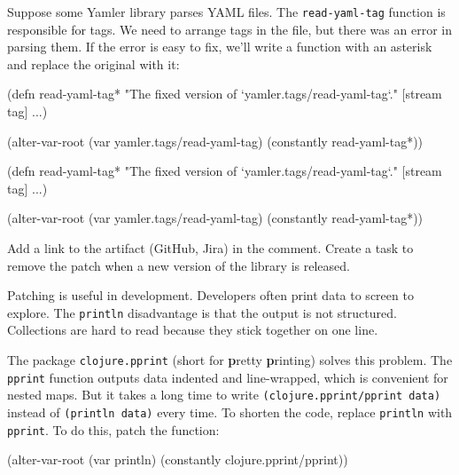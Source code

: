 Suppose some Yamler library parses YAML files.
The \verb|read-yaml-tag| function is responsible for tags.
We need to arrange tags in the file, but there was an error in parsing them.
If the error is easy to fix, we'll write a function with an asterisk and replace the original with it:

\ifx\DEVICETYPE\MOBILE

\begin{english}
  \begin{clojure}
(defn read-yaml-tag*
  "The fixed version of
  `yamler.tags/read-yaml-tag`."
  [stream tag]
  ...)

(alter-var-root
 (var yamler.tags/read-yaml-tag)
 (constantly read-yaml-tag*))
  \end{clojure}
\end{english}

\else

\begin{english}
  \begin{clojure}
(defn read-yaml-tag*
  "The fixed version of `yamler.tags/read-yaml-tag`."
  [stream tag]
  ...)

(alter-var-root
 (var yamler.tags/read-yaml-tag)
 (constantly read-yaml-tag*))
  \end{clojure}
\end{english}

\fi

Add a link to the artifact (GitHub, Jira) in the comment.
Create a task to remove the patch when a new version of the library is released.

Patching is useful in development.
Developers often print data to screen to explore.
The \verb|println| disadvantage is that the output is not structured.
Collections are hard to read because they stick together on one line.


The package \verb|clojure.pprint| (short for \textbf{p}retty \textbf{p}rinting) solves this problem. The \verb|pprint| function outputs data indented and line-wrapped, which is convenient for nested maps.
But it takes a long time to write \verb|(clojure.pprint/pprint data)| instead of \verb|(println data)| every time. To shorten the code, replace \verb|println| with \verb|pprint|.
To do this, patch the function:

\begin{english}
  \begin{clojure}
(alter-var-root
 (var println)
 (constantly clojure.pprint/pprint))
  \end{clojure}
\end{english}

